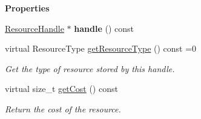 \begin{Indent}\textbf{ Properties}\par
\begin{DoxyCompactItemize}
\item 
\mbox{\label{classrev_1_1_resource_a9626b8a269c246efb5cfac390612ca19}} 
\mbox{\hyperlink{classrev_1_1_resource_handle}{Resource\+Handle}} $\ast$ {\bfseries handle} () const
\item 
\mbox{\label{classrev_1_1_resource_afd812ae242d83743aaedffa26fac5cb9}} 
virtual Resource\+Type \mbox{\hyperlink{classrev_1_1_resource_afd812ae242d83743aaedffa26fac5cb9}{get\+Resource\+Type}} () const =0
\begin{DoxyCompactList}\small\item\em Get the type of resource stored by this handle. \end{DoxyCompactList}\item 
\mbox{\label{classrev_1_1_resource_ab36fc3bac40c057a682cd1ee083ebeee}} 
virtual size\+\_\+t \mbox{\hyperlink{classrev_1_1_resource_ab36fc3bac40c057a682cd1ee083ebeee}{get\+Cost}} () const
\begin{DoxyCompactList}\small\item\em Return the cost of the resource. \end{DoxyCompactList}\end{DoxyCompactItemize}
\end{Indent}
